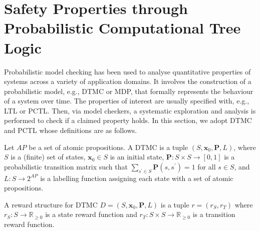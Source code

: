 \section{Safety Properties through Probabilistic Computational Tree Logic}\label{sec:DRLproperties}


Probabilistic model checking \cite{kwiatkowska_probabilistic_2018} has been
used to analyse quantitative properties of systems across a variety of application domains. It involves the construction of a probabilistic model, e.g., DTMC or MDP, that formally represents the behaviour of a system over time. The properties of interest are usually specified with, e.g., LTL or PCTL. Then, via model checkers, a systematic exploration and analysis is performed to check if a claimed property holds. In this section, we adopt DTMC and PCTL whose definitions are as follows. %

\begin{definition}[DTMC]
Let $AP$ be a set of atomic propositions. A DTMC is a tuple $(S,\textbf{x}_0,\textbf{P},L)$, where 
$S$ is a (finite) set of states, $\textbf{x}_0\in S$ is an initial state, 
$\textbf{P}:S\times S \rightarrow [0,1]$ is a probabilistic transition matrix such that $\sum_{s^{\prime}\in S}\textbf{P}(s,s^\prime)=1$ for all $s\in S$, and 
$L:S\rightarrow 2^{AP}$ is a labelling function assigning  each state with a set of atomic propositions.
\end{definition}
\begin{definition}
A reward structure for DTMC $D=(S,\textbf{x}_0,\textbf{P},L)$ is a tuple $r=(r_S, r_T)$ where $r_S:S\rightarrow \mathbb{R}_{\ge 0}$ is a state reward function and $r_T:S\times S \rightarrow \mathbb{R}_{\ge 0}$ is a transition reward function.
\end{definition}




